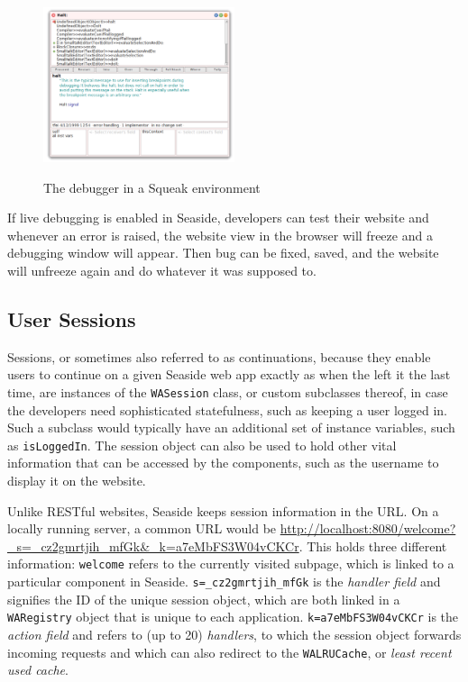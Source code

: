 \documentclass[a4paper,12pt,pagesize,headsepline,oribibl,titlepage]{scrartcl}
\begin{document}
\begin{figure}[h]
\begin{center}
\includegraphics*[width=0.5\textwidth]{images/debugger.png}\\
\caption{The debugger in a Squeak environment}
\label{abb:debug}
\end{center}
\end{figure}

If live debugging is enabled in Seaside, developers can test their website and whenever an error is raised, the website view in the browser will freeze and a debugging window will appear. Then bug can be fixed, saved, and the website will unfreeze again and do whatever it was supposed to.

\subsection{User Sessions}

Sessions, or sometimes also referred to as continuations, because they enable users to continue on a given Seaside web app  exactly as when the left it the last time, are instances of the \texttt{WASession} class, or custom subclasses thereof, in case the developers need sophisticated statefulness, such as keeping a user logged in. Such a subclass would typically have an additional set of instance variables, such as \texttt{isLoggedIn}. The session object can also be used to hold other vital information that can be accessed by the components, such as the username to display it on the website. \cite{ducasse2010dynamic}

Unlike RESTful websites, Seaside keeps session information in the URL. On a locally running server, a common URL would be \url{http://localhost:8080/welcome?_s=_cz2gmrtjih_mfGk&_k=a7eMbFS3W04vCKCr}. This holds three different information: \texttt{welcome} refers to the currently visited subpage, which is linked to a particular component in Seaside. \texttt{s=\_cz2gmrtjih\_mfGk} is the \emph{handler field} and signifies the ID of the unique session object, which are both linked in a \texttt{WARegistry} object that is unique to each application. \texttt{k=a7eMbFS3W04vCKCr} is the \emph{action field} and refers to (up to 20) \emph{handlers}, to which the session object forwards incoming requests and which can also redirect to the \texttt{WALRUCache}, or \emph{least recent used cache}.
\end{document}
